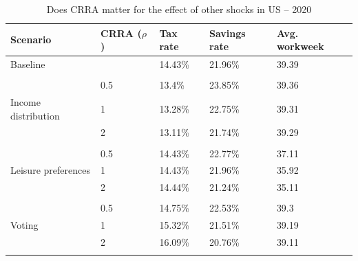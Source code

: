 \begin{table}[!htb]
\centering
\begin{threeparttable}
\caption{Does CRRA matter for the effect of other shocks in US -- 2020}
\label{table:US:CRRA:otherShocks}
\renewcommand{\arraystretch}{1.25}
\begin{tabularx}{.9\textwidth}{YYYYY}
\toprule
\textbf{Scenario} & \textbf{CRRA} ($\rho$) & \textbf{Tax rate} & \textbf{Savings rate} & \textbf{Avg. workweek}\\
\midrule 
Baseline &  & 14.43\% & 21.96\% & 39.39 \\[.5em]\hline\\[-.75em]
 & 0.5 & 13.4\% & 23.85\% & 39.36 \\
Income distribution & 1 & 13.28\% & 22.75\% & 39.31 \\
 & 2 & 13.11\% & 21.74\% & 39.29 \\[.5em]\hline\\[-.75em]
 & 0.5 & 14.43\% & 22.77\% & 37.11 \\
Leisure preferences & 1 & 14.43\% & 21.96\% & 35.92 \\
 & 2 & 14.44\% & 21.24\% & 35.11 \\[.5em]\hline\\[-.75em]
 & 0.5 & 14.75\% & 22.53\% & 39.3 \\
Voting & 1 & 15.32\% & 21.51\% & 39.19 \\
 & 2 & 16.09\% & 20.76\% & 39.11 \\[.5em]\hline\\[-.75em]
 \bottomrule
\end{tabularx}
\end{threeparttable}
\end{table}

